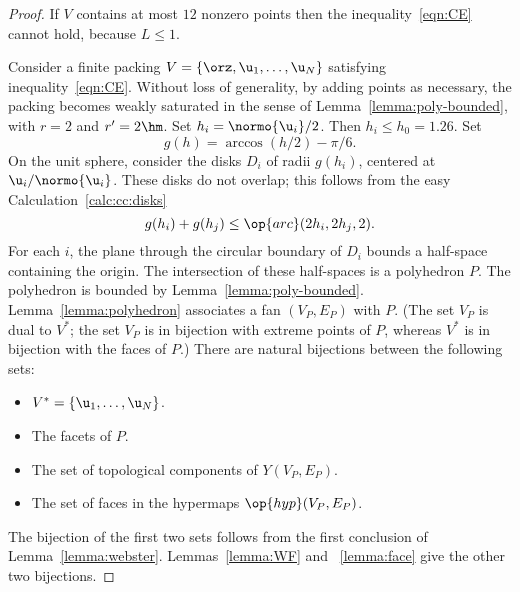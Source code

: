 \begin{proof} If $ V$ contains at most $12$ nonzero points then
the inequality~\ref{eqn:CE} cannot hold, because $L\le 1$.

Consider a finite packing $ V=\{\orz, \u_1,\ldots, \u_N\}$ satisfying
inequality~\ref{eqn:CE}.  Without loss of generality, by adding points
as necessary, the packing becomes weakly saturated in the sense of
Lemma~\ref{lemma:poly-bounded}, with $r=2$ and $r'=2\hm$.  Set $h_i =
\normo{ \u_i}/2$.  Then $h_i\le h_0=1.26$.  Set
\begin{displaymath}%
g(h) = \arccos(h/2) - \pi/6.  %
\end{displaymath}%
On the unit sphere, consider the disks $D_i$ of radii $g(h_i)$,
centered at $ \u_i/\normo{ \u_i}$.  These disks do not overlap; this
follows from the easy
Calculation~\ref{calc:cc:disks} %
\begin{displaymath}%
g(h_i) + g(h_j) \le \op{arc}(2h_i,2h_j,2).%
\end{displaymath}%
%
For each $i$, the plane through the circular boundary of $D_i$ bounds
a half-space containing the origin.  The intersection of these
half-spaces is a polyhedron $P$.  The polyhedron is bounded by
Lemma~\ref{lemma:poly-bounded}.  Lemma~\ref{lemma:polyhedron}
associates a fan $(V_P,E_P)$ with $P$.  (The set $V_P$ is dual to $
V^*$; the set $V_P$ is in bijection with extreme points of $P$, whereas $
V^*$ is in bijection with the faces of $P$.)  There are natural
bijections between the following sets:
\begin{itemize}
\item $ V^* = \{ \u_1,\ldots, \u_N\}$.
\item The  facets of $P$.
\item The set of  topological components of $Y(V_P,E_P)$.
\item The set of faces in the hypermaps $\op{hyp}(V_P,E_P)$.
\end{itemize}
The bijection of the first two sets follows from the first conclusion
of Lemma~\ref{lemma:webster}.  Lemmas~\ref{lemma:WF} and
~\ref{lemma:face} give the other two bijections.


\end{proof}
